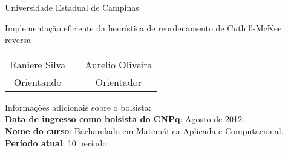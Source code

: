 \documentclass[12pt,a4paper]{article}
\begin{document}
\begin{center}
  \Huge{Universidade Estadual de Campinas}

  \vspace{3cm}

  \Large{Implementa\c{c}\~{a}o eficiente da heur\'{i}stica de reordenamento de Cuthill-McKee reversa}

  \vspace{2cm}

  \large{
    \begin{tabular}{ccc}
      Raniere Silva & \hspace{1cm} & Aurelio Oliveira \\
      Orientando & & Orientador
    \end{tabular}}
\end{center}

\vfill

\noindent Informações adicionais sobre o bolsista: \\
\textbf{Data de ingresso como bolsista do CNPq}: Agosto de 2012. \\
\textbf{Nome do curso}: Bacharelado em Matemática Aplicada e Computacional. \\
\textbf{Período atual}: 10 período.

\clearpage

\tableofcontents



\end{document}
